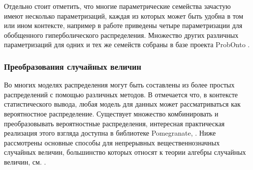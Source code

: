 Отдельно стоит отметить, что многие параметрические семейства зачастую имеют несколько параметризаций, каждая из которых может быть удобна в том или ином контексте, например в работе \cite{prause1999generalized} приведены четыре параметризации для обобщенного гиперболического распределения. Множество других различных параметризаций для одних и тех же семейств собраны в базе проекта ProbOnto \cite{swat2016probonto}. 

 
\subsubsection*{Преобразования случайных величин}

Во многих моделях распределения могут быть составлены из более  простых распределений с помощью различных методов. В \cite{barndorff2014information} отмечается что, в контексте статистического вывода, любая модель для данных может рассматриваться как вероятностное распределение. Существует множество комбинировать и преобразовывать вероятностные распределения, интересная практическая реализация этого взгляда доступна в библиотеке Pomegranate, \cite{schreiber2018pomegranate}. Ниже рассмотрены основные способы для непрерывных вещественнозначных случайных величин, большинство которых относят к теории алгебры случайных величин, см{.} \cite{springer1979algebra}.
